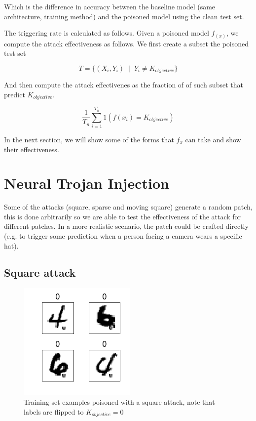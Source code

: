 \documentclass[letterpaper, 10 pt, conference]{ieeeconf}  %
\begin{document}
Which is the difference in accuracy between the baseline model
(same architecture, training method) and the poisoned model using the clean
test set.

The triggering rate is calculated as follows. Given a poisoned model $f_(x)$,
we compute the attack effectiveness as follows. We first create a subset the
poisoned test set 

$$T = \{(X_i, Y_i) \;\;|\;\;Y_i  \neq K_{objective}\}$$

And then compute the attack effectivenes as the fraction of of such subset that predict $K_{objective}$.

$$\frac{1}{T_n} \sum_{i=1}^{T_n} 1(f(x_i) = K_{objective})$$

In the next section, we will show some of the forms that $f_x$ can take and show their effectiveness.


\section{Neural Trojan Injection}

Some of the attacks (square, sparse and moving square) generate a random patch,
this is done arbitrarily so we are able to test the effectiveness of the attack
for different patches. In a more realistic scenario, the patch could be
crafted directly (e.g. to trigger some prediction when a person facing a camera
wears a specific hat).

\subsection{Square attack}

\begin{figure}[h]
\caption{Training set examples poisoned with a square attack, note that labels are flipped to $K_{objective}=0$}
\centering
\includegraphics{square.png}
\end{figure}
\end{document}
